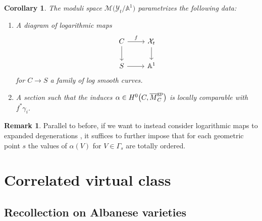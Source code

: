 \documentclass[11pt]{article}
\numberwithin{equation}{section}
\newcommand{\M}{\mathcal{M}}
\newcommand{\X}{\mathcal{X}}
\newcommand{\Y}{\mathcal{Y}}
\renewcommand{\bar}{\overline}
\numberwithin{equation}{section}
\newtheorem{coro}[theo]{Corollary}
\theoremstyle{definition}
\newtheorem{remarkk}[theo]{Remark}
\begin{document}
\begin{coro}\label{prop:logmapsdegeneration}
 The moduli space $\M\bigl(\Y_t\slash\mathbb A^1\bigr)$ parametrizes the following data:
 \begin{enumerate}\itemsep=0pt
 \item[$(1)$] A diagram of logarithmic maps
 \[
 \begin{tikzcd}
 C\ar[r,"f"]\ar[d] & \X_t\ar[d]\\
 S\ar[r] &\mathbb A^1
 \end{tikzcd}
 \]
 for $C\to S$ a family of log smooth curves.
 \item[$(2)$] A section  such that the induces $\alpha\in H^0\bigl(C,\bar{M}_C^{\rm gp}\bigr)$ is locally comparable with $f^*\gamma_i$.
 \end{enumerate}
\end{coro}
\begin{remarkk}
 Parallel to before, if we want to instead consider logarithmic maps to expanded degenerations \cite{kim2010logarithmic,li2001stable,maulik2023logarithmic}, it suffices to further impose that for each geometric point $s$ the values of $\alpha(V)$ for $V\in\Gamma_s$ are totally ordered.
\end{remarkk}

\section{Correlated virtual class}

\subsection{Recollection on Albanese varieties}
\end{document}
